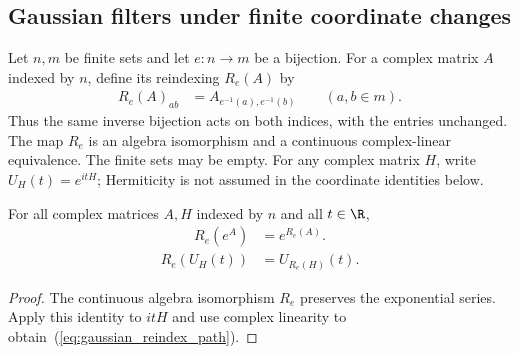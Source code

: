 \subsection{Gaussian filters under finite coordinate changes}
\label{sec:gaussian_reindex}


Let $n,m$ be finite sets and let $e:n\to m$ be a bijection. For a
complex matrix $A$ indexed by $n$, define its reindexing $R_e(A)$ by
\begin{align}
    R_e(A)_{ab}&=A_{e^{-1}(a),e^{-1}(b)}\qquad(a,b\in m).
    \label{eq:gaussian_reindex_coordinates}
\end{align}
Thus the same inverse bijection acts on both indices, with the entries
unchanged. The map $R_e$ is an algebra isomorphism and a continuous
complex-linear equivalence. The finite sets may be empty.
For any complex matrix $H$, write $U_H(t)=e^{itH}$; Hermiticity is not
assumed in the coordinate identities below.

\begin{theorem}
    \label{thm:gaussian_reindex_exp}
    \leanok
    For all complex matrices $A,H$ indexed by $n$ and all $t\in\R$,
    \begin{align}
        R_e(e^A)&=e^{R_e(A)}.
        \label{eq:gaussian_reindex_exp}
    \end{align}
    \begin{align}
        R_e(U_H(t))&=U_{R_e(H)}(t).
        \label{eq:gaussian_reindex_path}
    \end{align}
\end{theorem}
\begin{proof}\leanok
    The continuous algebra isomorphism $R_e$ preserves the exponential
    series. Apply this identity to $itH$ and use complex linearity to
    obtain~(\ref{eq:gaussian_reindex_path}).
\end{proof}

